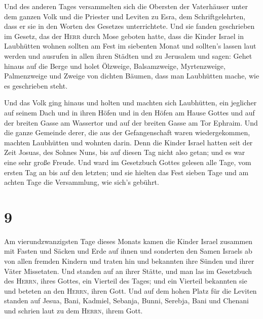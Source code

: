  Und des anderen Tages versammelten sich die Obersten der
Vaterhäuser unter dem ganzen Volk und die Priester und Leviten zu Esra,
dem Schriftgelehrten, dass er sie in den Worten des Gesetzes
unterrichtete.  Und sie fanden geschrieben im Gesetz, das
der \textsc{Herr} durch Mose geboten hatte, dass die Kinder Israel in
Laubhütten wohnen sollten am Fest im siebenten Monat  und
sollten's lassen laut werden und ausrufen in allen ihren Städten und zu
Jerusalem und sagen: Gehet hinaus auf die Berge und holet Ölzweige,
Balsamzweige, Myrtenzweige, Palmenzweige und Zweige von dichten Bäumen,
dass man Laubhütten mache, wie es geschrieben steht.

 Und das Volk ging hinaus und holten und machten sich
Laubhütten, ein jeglicher auf seinem Dach und in ihren Höfen und in den
Höfen am Hause Gottes und auf der breiten Gasse am Wassertor und auf der
breiten Gasse am Tor Ephraim.  Und die ganze Gemeinde
derer, die aus der Gefangenschaft waren wiedergekommen, machten
Laubhütten und wohnten darin. Denn die Kinder Israel hatten seit der
Zeit Josuas, des Sohnes Nuns, bis auf diesen Tag nicht also getan; und
es war eine sehr große Freude.  Und ward im Gesetzbuch
Gottes gelesen alle Tage, vom ersten Tag an bis auf den letzten; und sie
hielten das Fest sieben Tage und am achten Tage die Versammlung, wie
sich's gebührt.

\hypertarget{section-8}{%
\section{9}\label{section-8}}

 Am vierundzwanzigsten Tage dieses Monats kamen die Kinder
Israel zusammen mit Fasten und Säcken und Erde auf ihnen 
und sonderten den Samen Israels ab von allen fremden Kindern und traten
hin und bekannten ihre Sünden und ihrer Väter Missetaten. 
Und standen auf an ihrer Stätte, und man las im Gesetzbuch des
\textsc{Herrn}, ihres Gottes, ein Vierteil des Tages; und ein Vierteil
bekannten sie und beteten an den \textsc{Herrn}, ihren Gott.
 Und auf dem hohen Platz für die Leviten standen auf
Jesua, Bani, Kadmiel, Sebanja, Bunni, Serebja, Bani und Chenani und
schrien laut zu dem \textsc{Herrn}, ihrem Gott.

